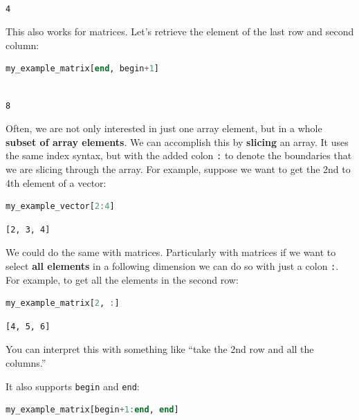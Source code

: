 \documentclass[
  notoc %
]{tufte-book}
\newcommand{\passthrough}[1]{#1}
\begin{document}
\begin{lstlisting}[language=Output]

4

\end{lstlisting}

This also works for matrices. Let's retrieve the element of the last row
and second column:

\begin{lstlisting}[language=Julia]
my_example_matrix[end, begin+1]
\end{lstlisting}

\begin{lstlisting}[language=Output]

8

\end{lstlisting}

Often, we are not only interested in just one array element, but in a
whole \textbf{subset of array elements}. We can accomplish this by
\textbf{slicing} an array. It uses the same index syntax, but with the
added colon \passthrough{\lstinline!:!} to denote the boundaries that we
are slicing through the array. For example, suppose we want to get the
2nd to 4th element of a vector:

\begin{lstlisting}[language=Julia]
my_example_vector[2:4]
\end{lstlisting}

\begin{lstlisting}[language=Output]
[2, 3, 4]
\end{lstlisting}

We could do the same with matrices. Particularly with matrices if we
want to select \textbf{all elements} in a following dimension we can do
so with just a colon \passthrough{\lstinline!:!}. For example, to get
all the elements in the second row:

\begin{lstlisting}[language=Julia]
my_example_matrix[2, :]
\end{lstlisting}

\begin{lstlisting}[language=Output]
[4, 5, 6]
\end{lstlisting}

You can interpret this with something like ``take the 2nd row and all
the columns.''

It also supports \passthrough{\lstinline!begin!} and
\passthrough{\lstinline!end!}:

\begin{lstlisting}[language=Julia]
my_example_matrix[begin+1:end, end]
\end{lstlisting}
\end{document}
